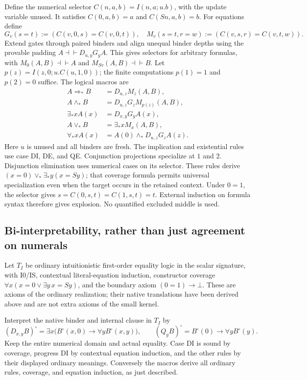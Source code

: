\documentclass[11pt,letterpaper]{article}
\theoremstyle{definition}\newtheorem{definition}[theorem]{Definition}
\theoremstyle{remark}\newtheorem{remark}[theorem]{Remark}
\begin{document}
Define the numerical selector $C(n,a,b)=I(n,a;u.b)$, with the update
variable unused. It satisfies $C(0,a,b)=a$ and $C(Sn,a,b)=b$.
For equations define
\[
 G_v(s=t):=(C(v,0,s)=C(v,0,t)),
 \quad
 M_v(s=t,r=w):=(C(v,s,r)=C(v,t,w)).
\]
Extend gates through paired binders and align unequal binder depths
using the provable padding $A\dashv\vdash D_{u,y}G_yA$.
This gives selectors for arbitrary formulas, with
$M_0(A,B)\dashv\vdash A$ and $M_{Sv}(A,B)\dashv\vdash B$.
Let $p(z)=I(z,0;u.C(u,1,0))$; the finite computations
$p(1)=1$ and $p(2)=0$ suffice. The logical macros are
\[
\begin{aligned}
 A\Rightarrow_*B&=D_{u,z}M_z(A,B),\\
 A\wedge_*B&=D_{u,z}G_zM_{p(z)}(A,B),\\
 \exists_*xA(x)&=D_{x,y}G_yA(x),\\
 A\vee_*B&=\exists_*xM_x(A,B),\\
 \forall_*xA(x)&=A(0)\wedge_*D_{u,z}G_zA(z).
\end{aligned}
\]
Here $u$ is unused and all binders are fresh. The implication and
existential rules use case DI, DE, and QE. Conjunction projections
specialize at $1$ and $2$. Disjunction elimination uses numerical
cases on its selector. These rules derive
$(x=0)\vee_*\exists_*y(x=Sy)$; that coverage formula permits
universal specialization even when the target occurs in the retained
context. Under $0=1$, the selector gives
$s=C(0,s,t)=C(1,s,t)=t$. External induction on formula syntax
therefore gives explosion. No quantified excluded middle is used.

\subsection{Bi-interpretability, rather than just agreement on numerals}

Let $T_I$ be ordinary intuitionistic first-order equality logic in the
scalar signature, with I0/IS, contextual literal-equation induction,
constructor coverage $\forall x(x=0\lor\exists y\,x=Sy)$, and the
boundary axiom $(0=1)\to\bot$. These are axioms of the ordinary
realization; their native translations have been derived above and
are not extra axioms of the small kernel.

Interpret the native binder and internal clause in $T_I$ by
\[
 (D_{x,y}B)^\circ=\exists x\bigl(B^\circ(x,0)\to
                  \forall yB^\circ(x,y)\bigr),
 \qquad
 (Q_yB)^\circ=B^\circ(0)\to\forall yB^\circ(y).
\]
Keep the entire numerical domain and actual equality. Case DI is
sound by coverage, progress DI by contextual equation induction,
and the other rules by their displayed ordinary meanings.
Conversely the macros derive all ordinary rules, coverage, and
equation induction, as just described.
\end{document}
